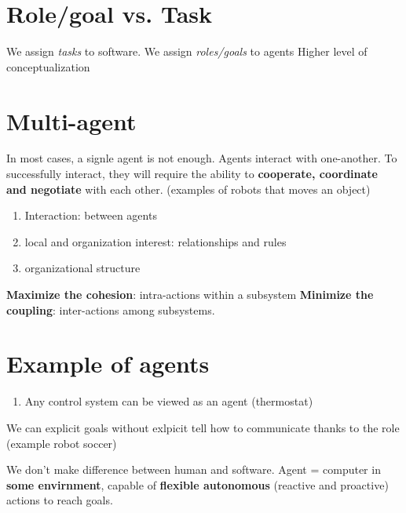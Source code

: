 \documentclass[11pt]{article}
\begin{document}
\section{Role/goal vs. Task} %
\label{sec:role_goal_vs_task}
We assign \textit{tasks} to software.
We assign \textit{roles/goals} to agents
Higher level of conceptualization

\section{Multi-agent} %
\label{sec:multi_agent}
In most cases, a signle agent is not enough.
Agents interact with one-another.
To successfully interact, they will require the ability to \textbf{cooperate, coordinate and negotiate} with each other. (examples of robots that moves an object)

\begin{enumerate}
	\item Interaction: between agents
	\item local and organization interest: relationships and rules
	\item organizational structure
\end{enumerate}

\textbf{Maximize the cohesion}: intra-actions within a subsystem
\textbf{Minimize the coupling}: inter-actions among subsystems.


\section{Example of agents} %
\label{sec:example_of_agents}
\begin{enumerate}
	\item Any control system can be viewed as an agent (thermostat)
\end{enumerate}

We can explicit goals without exlpicit tell how to communicate thanks to the role (example robot soccer)

We don't make difference between human and software.
Agent = computer in \textbf{some envirnment}, capable of \textbf{flexible autonomous} (reactive and proactive) actions to reach goals.
\end{document}

